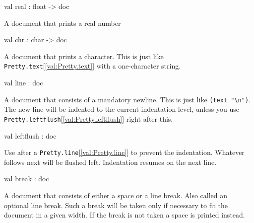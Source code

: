 \documentclass[11pt]{article}
\begin{document}
\label{val:Pretty.real}\begin{ocamldoccode}
val real : float -> doc
\end{ocamldoccode}
\begin{ocamldocdescription}
A document that prints a real number


\end{ocamldocdescription}




\label{val:Pretty.chr}\begin{ocamldoccode}
val chr : char -> doc
\end{ocamldoccode}
\begin{ocamldocdescription}
A document that prints a character. This is just like {\tt{Pretty.text}}[\ref{val:Pretty.text}]
    with a one-character string.


\end{ocamldocdescription}




\label{val:Pretty.line}\begin{ocamldoccode}
val line : doc
\end{ocamldoccode}
\begin{ocamldocdescription}
A document that consists of a mandatory newline. This is just like {\tt{(text\
    "{\textbackslash}n")}}. The new line will be indented to the current indentation level,
    unless you use {\tt{Pretty.leftflush}}[\ref{val:Pretty.leftflush}] right after this.


\end{ocamldocdescription}




\label{val:Pretty.leftflush}\begin{ocamldoccode}
val leftflush : doc
\end{ocamldoccode}
\begin{ocamldocdescription}
Use after a {\tt{Pretty.line}}[\ref{val:Pretty.line}] to prevent the indentation. Whatever follows 
 next will be flushed left. Indentation resumes on the next line.


\end{ocamldocdescription}




\label{val:Pretty.break}\begin{ocamldoccode}
val break : doc
\end{ocamldoccode}
\begin{ocamldocdescription}
A document that consists of either a space or a line break. Also called
    an optional line break. Such a break will be
    taken only if necessary to fit the document in a given width. If the break
    is not taken a space is printed instead.


\end{ocamldocdescription}
\end{document}
